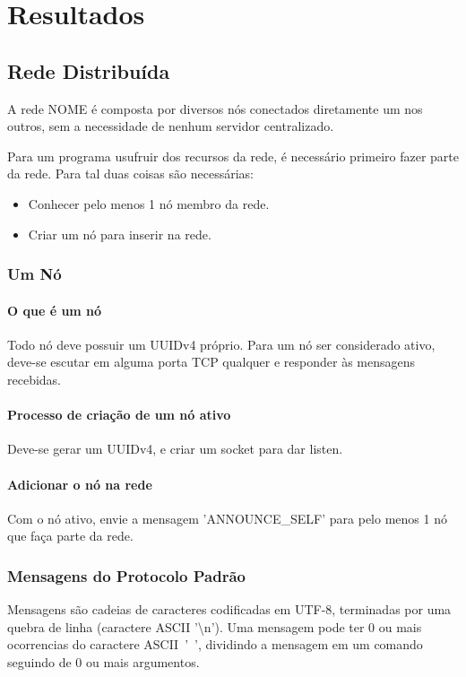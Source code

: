 \chapter{Resultados}
\label{sec:resultados}

\section{Rede Distribuída}
\label{sec:resultados:rede}

  A rede NOME é composta por diversos nós conectados diretamente um nos outros, sem a necessidade de nenhum servidor centralizado.
  
  Para um programa usufruir dos recursos da rede, é necessário primeiro fazer parte da rede. Para tal duas coisas são necessárias:
  \begin{itemize}
    \item Conhecer pelo menos 1 nó membro da rede.
    \item Criar um nó para inserir na rede.
  \end{itemize}
  
  \subsection{Um Nó}
    \subsubsection{O que é um nó}
      Todo nó deve possuir um UUIDv4 próprio.
      Para um nó ser considerado ativo, deve-se escutar em alguma porta TCP qualquer e responder às mensagens recebidas.
      
    \subsubsection{Processo de criação de um nó ativo}
      Deve-se gerar um UUIDv4, e criar um socket para dar listen.

    \subsubsection{Adicionar o nó na rede}
      Com o nó ativo, envie a mensagem 'ANNOUNCE\_SELF' para pelo menos 1 nó que faça parte da rede.

  \subsection{Mensagens do Protocolo Padrão}
    Mensagens são cadeias de caracteres codificadas em UTF-8, terminadas por uma quebra de linha
    (caractere ASCII '\textbackslash n'). Uma mensagem pode ter 0 ou mais ocorrencias do caractere ASCII~'~',
    dividindo a mensagem em um comando seguindo de 0 ou mais argumentos.
    
